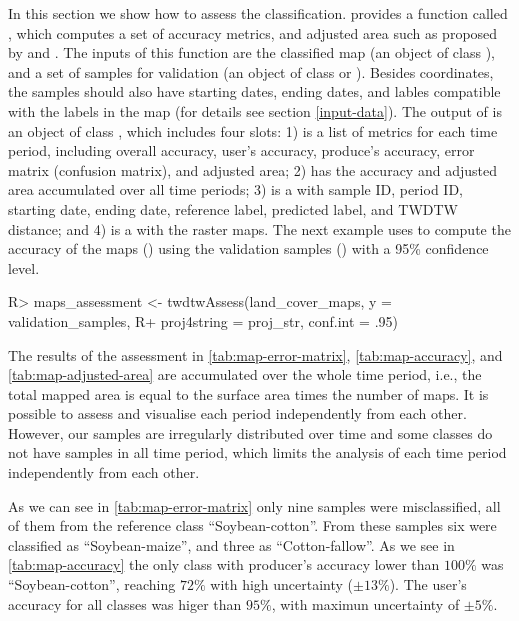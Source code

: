 \documentclass[article,shortnames]{jss}
\begin{document}
In this section we show how to assess the classification. 
provides a function called , which computes a set of
accuracy metrics, and adjusted area such as proposed by
\citet{Olofsson:2013} and \citet{Olofsson:2014}. The inputs of this
function are the classified map (an object of class ),
and a set of samples for validation (an object of class
 or ). Besides
coordinates, the samples should also have starting dates, ending dates,
and lables compatible with the labels in the map (for details see
section \ref{input-data}). The output of  is an object
of class , which includes four slots: 1)
 is a list of metrics for each time period,
including overall accuracy, user's accuracy, produce's accuracy, error
matrix (confusion matrix), and adjusted area; 2) 
has the accuracy and adjusted area accumulated over all time periods; 3)
 is a  with sample ID, period
ID, starting date, ending date, reference label, predicted label, and
TWDTW distance; and 4)  is a  with the
raster maps. The next example uses  to compute the
accuracy of the maps () using the validation
samples () with a 95\% confidence level.

\begin{CodeChunk}

\begin{CodeInput}
R> maps_assessment <- twdtwAssess(land_cover_maps, y = validation_samples, 
R+   proj4string = proj_str, conf.int = .95)
\end{CodeInput}
\end{CodeChunk}

The results of the assessment in \autoref{tab:map-error-matrix},
\ref{tab:map-accuracy}, and \ref{tab:map-adjusted-area} are accumulated
over the whole time period, i.e., the total mapped area is equal to the
surface area times the number of maps. It is possible to assess and
visualise each period independently from each other. However, our
samples are irregularly distributed over time and some classes do not
have samples in all time period, which limits the analysis of each time
period independently from each other.

As we can see in \autoref{tab:map-error-matrix} only nine samples were
misclassified, all of them from the reference class ``Soybean-cotton''.
From these samples six were classified as ``Soybean-maize'', and three
as ``Cotton-fallow''. As we see in \autoref{tab:map-accuracy} the only
class with producer's accuracy lower than \(100\%\) was
``Soybean-cotton'', reaching \(72\%\) with high uncertainty
(\(\pm13\%\)). The user's accuracy for all classes was higer than
\(95\%\), with maximun uncertainty of \(\pm5\%\).
\end{document}
